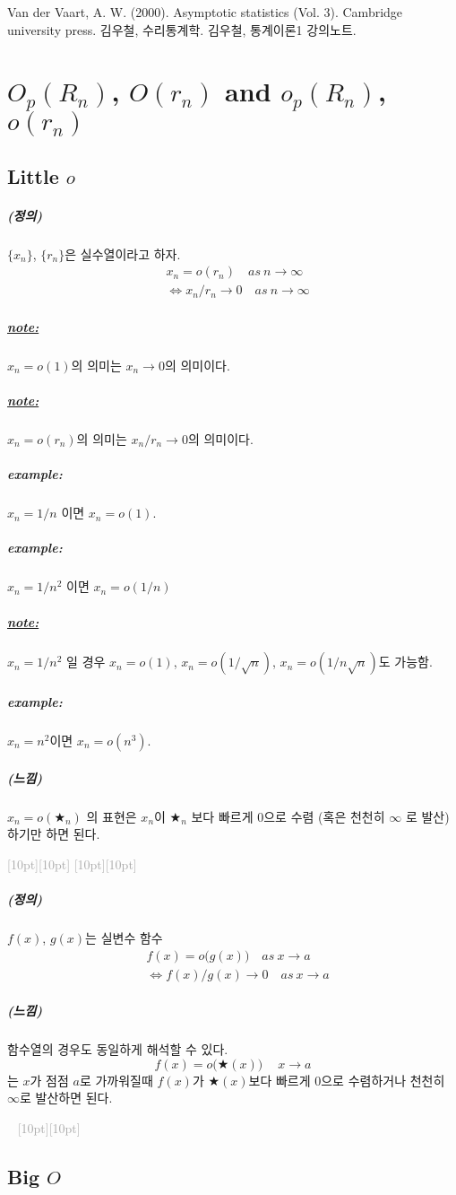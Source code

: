 \documentclass[12pt,oneside,english]{book}
\newcommand{\dash}{\vspace{2em}\noindent \textcolor{darkgray}{\hrulefill~ \raisebox{-2.5pt}[10pt][10pt]{\leafright \decofourleft \decothreeleft  \aldineright \decotwo \floweroneleft \decoone   \floweroneright \decotwo \aldineleft\decothreeright \decofourright \leafleft} ~  \hrulefill \\ \vspace{2em}}}
\newcommand{\rdash}{\noindent \textcolor{darkgray}{ \raisebox{-1.9pt}[10pt][10pt]{\leafright} \hrulefill \raisebox{-1.9pt}[10pt][10pt]{\leafright \decofourleft \decothreeleft  \aldineright \decotwo \floweroneleft \decoone}}}
\def\dfn{\paragraph{\Large(정의)}\Large}
\def\fl{\paragraph{\Large(느낌)}\Large}
\def\note{\paragraph{\Large\textit{\underline{note:}}}\Large}
\def\ex{\paragraph{\Large\textit{example:}}\Large}
\begin{document}
\begin{thebibliography}{9} 
 Van der Vaart, A. W. (2000). Asymptotic statistics (Vol. 3). Cambridge university press.
 김우철, 수리통계학.
 김우철, 통계이론1 강의노트.
\end{thebibliography}

\chapter{$O_p(R_n)$, $O(r_n)$ and $o_p(R_n)$, $o(r_n)$}
\section{Little $o$}

\dfn $\{x_n\}$, $\{r_n\}$은 실수열이라고 하자. 
\begin{align*}
& x_n=o(r_n) \quad as~  n\to \infty \\
&\Longleftrightarrow x_n/r_n \to 0 \quad as ~ n \to \infty 
\end{align*}

\note $x_n=o(1)$의 의미는 $x_n\to 0$의 의미이다. 

\note $x_n=o(r_n)$의 의미는 $x_n/r_n \to 0$의 의미이다. 

\ex $x_n=1/n$ 이면 $x_n=o(1)$. 

\ex $x_n=1/n^2$ 이면 $x_n=o(1/n)$

\note $x_n=1/n^2$ 일 경우 $x_n=o(1)$, $x_n=o(1/\sqrt{n})$, $x_n=o(1/n\sqrt{n})$도 가능함. 

\ex $x_n=n^2$이면 $x_n=o(n^3)$. 

\fl $x_n=o(\bigstar_n)$ 의 표현은 $x_n$이 $\bigstar_n$ 보다 빠르게 $0$으로 수렴 (혹은 천천히 $\infty$ 로 발산) 하기만 하면 된다. 

\rdash

\dfn $f(x)$, $g(x)$는 실변수 함수 
\begin{align*}
& f(x)=o\big(g(x)\big) \quad as~  x\to a \\
&\Longleftrightarrow f(x)/g(x) \to 0 \quad as ~ x \to a
\end{align*}

\fl 함수열의 경우도 동일하게 해석할 수 있다. 
\[
f(x)=o\big(\bigstar(x)\big) \quad ~ x \to a
\]
는 $x$가 점점 $a$로 가까워질때 $f(x)$가 $\bigstar(x)$보다 빠르게 $0$으로 수렴하거나 천천히 $\infty$로 발산하면 된다. 

\dash

\section{Big $O$}
\end{document}
